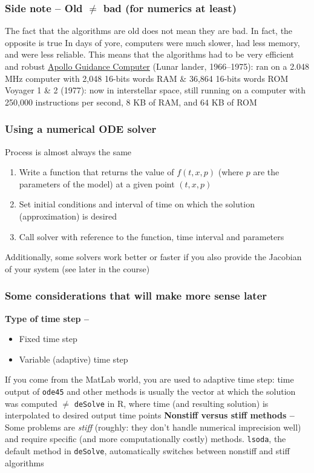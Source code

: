 \documentclass[aspectratio=169]{beamer}
\begin{document}
\begin{frame}\frametitle{Side note -- Old $\neq$ bad (for numerics at least)}
The fact that the algorithms are old does not mean they are bad. In fact, the opposite is true
\vfill
In days of yore, computers were much slower, had less memory, and were less reliable. This means that the algorithms had to be very efficient and robust
\vfill
\href{https://en.wikipedia.org/wiki/Apollo_Guidance_Computer}{Apollo Guidance Computer} (Lunar lander, 1966--1975): ran on a 2.048 MHz computer with 2,048 16-bits words RAM \& 36,864 16-bits words ROM
\vfill
Voyager 1 \& 2 (1977): now in interstellar space, still running on a computer with 250,000 instructions per second, 8 KB of RAM, and 64 KB of ROM
\end{frame}

\begin{frame}\frametitle{Using a numerical ODE solver}
Process is almost always the same
\vfill
\begin{enumerate}
\item Write a function that returns the value of $f(t,x,p)$ (where $p$ are the parameters of the model) at a given point $(t,x,p)$
\item Set initial conditions and interval of time on which the solution (approximation) is desired
\item Call solver with reference to the function, time interval and parameters
\end{enumerate}
\vfill
Additionally, some solvers work better or faster if you also provide the Jacobian of your system (see later in the course)
\end{frame}


\begin{frame}\frametitle{Some considerations that will make more sense later}
\textbf{Type of time step --}
\begin{itemize}
\item Fixed time step
\item Variable (adaptive) time step
\end{itemize}
If you come from the MatLab world, you are used to adaptive time step: time output of \texttt{ode45} and other methods is usually the vector at which the solution was computed $\neq$ \texttt{deSolve} in R, where time (and resulting solution) is interpolated to desired output time points
\vfill
\textbf{Nonstiff versus stiff methods --}
Some problems are \emph{stiff} (roughly: they don't handle numerical imprecision well) and require specific (and more computationally costly) methods. \texttt{lsoda}, the default method in \texttt{deSolve}, automatically switches between nonstiff and stiff algorithms
\end{frame}
\end{document}
